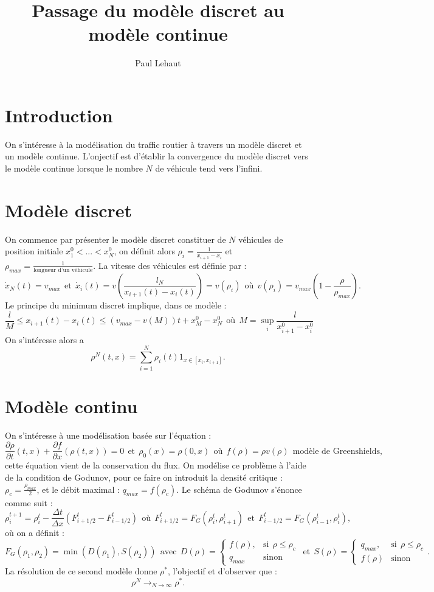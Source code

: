 \documentclass{article}
\title{Passage du modèle discret au modèle continue}
\author{Paul Lehaut}
\begin{document}
\maketitle

\section{Introduction}
On s'intéresse à la modélisation du traffic routier à travers un modèle discret et un modèle continue. L'onjectif est d'établir la convergence du modèle discret vers le modèle continue lorsque le nombre $N$ de véhicule tend vers l'infini.

\section{Modèle discret}
On commence par présenter le modèle discret constituer de $N$ véhicules de position initiale $x^0_1 < ...<x^0_N$, on définit alors $\rho_i = \frac{1}{x_{i+1} - x_i}$ et $\rho_{max} = \frac{1}{\text{longueur d'un véhicule}}$. La vitesse des véhicules est définie par : 
$$\dot x_N(t) = v_{max} \ \ \text{et} \ \ \dot x_i(t)= v(\frac{l_N}{x_{i+1}(t) - x_i(t)}) = v(\rho_i) \ \ \text{où} \ \  v(\rho_i)=v_{max}(1-\frac{\rho}{\rho_{max}}).$$
Le principe du minimum discret implique, dans ce modèle : 
$$\frac{l}{M}\le x_{i+1}(t) - x_i(t)\le (v_{max} - v(M))t + x_M^0 - x_N^0 \ \ \text{où} \ \ M = \sup_i \frac{l}{x_{i+1}^0 - x_i^0}$$
On s'intéresse alors a $$\rho^N(t, x) = \sum_{i=1}^N\rho_i(t)1_{x\in [x_i,x_{i+1}]}.$$
\bskip 

\section{Modèle continu}
On s'intéresse à une modélisation basée sur l'équation : 
$$\frac{\partial \rho}{\partial t}(t,x) + \frac{\partial f}{\partial x}(\rho(t,x)) = 0 \ \ \text{et} \ \ \rho_0(x)=\rho(0,x) \ \ \text{où} \ \ f(\rho)=\rho v(\rho) \ \ \text{modèle de Greenshields,}$$
cette équation vient de la conservation du flux.
\sskip 
On modélise ce problème à l'aide de la condition de Godunov, pour ce faire on introduit la densité critique : $\rho_c = \frac{\rho_{max}}{2}$, et le débit maximal : $q_{max} = f(\rho_c)$. Le schéma de Godunov s'énonce comme suit : 
$$\rho_i^{t+1} = \rho_i^t - \frac{\Delta t}{\Delta x}(F_{i+1/2}^t - F_{i-1/2}^t) \ \ \text{où} \ \ F_{i+1/2}^t = F_G(\rho_i^t, \rho_{i+1}^t) \ \ \text{et} \ \ F_{i-1/2}^t = F_G(\rho_{i-1}^t, \rho_i^t),$$
où on a définit : 
$$F_G(\rho_1, \rho_2) = \min(D(\rho_1), S(\rho_2)) \ \ \text{avec} \ \ D(\rho) =
\left\{
    \begin{array}{ll}
        f(\rho), & \text{si} \ \ \rho\le\rho_c \\
        q_{max} & \mbox{sinon}
    \end{array}
\right.
\ \ \text{et} \ \ S(\rho) =
\left\{
    \begin{array}{ll}
        q_{max}, & \text{si} \ \ \rho\le\rho_c \\
        f(\rho) & \mbox{sinon}
    \end{array}
\right. .$$
La résolution de ce second modèle donne $\rho^*$, l'objectif et d'observer que : 
$$\rho^N \to_{N\to\infty} \rho^*.$$
\bskip 
\end{document}
